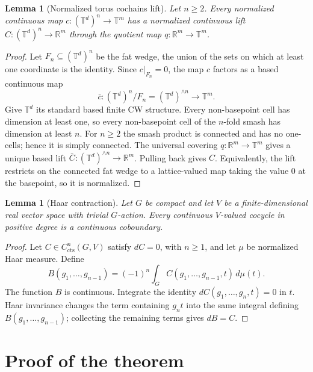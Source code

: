 \documentclass[11pt]{article}
\newtheorem{lemma}[theorem]{Lemma}
\newcommand{\T}{\mathbb T}
\newcommand{\R}{\mathbb R}
\newcommand{\cts}{\mathrm{cts}}
\begin{document}
\begin{lemma}[Normalized torus cochains lift]\label{lem:lift}
Let $n\ge2$.  Every normalized continuous map
$c:(\T^d)^n\to\T^m$ has a normalized continuous lift
$C:(\T^d)^n\to\R^m$ through the quotient map
$q:\R^m\to\T^m$.
\end{lemma}

\begin{proof}
Let $F_n\subseteq(\T^d)^n$ be the fat wedge, the union of the sets on which
at least one coordinate is the identity.  Since $c|_{F_n}=0$, the map $c$
factors as a based continuous map
\[
\bar c:(\T^d)^n/F_n=(\T^d)^{\wedge n}\longrightarrow\T^m.
\]
Give $\T^d$ its standard based finite CW structure.  Every non-basepoint cell
has dimension at least one, so every non-basepoint cell of the $n$-fold smash
has dimension at least $n$.  For $n\ge2$ the smash product is connected and
has no one-cells; hence it is simply connected.  The universal covering
$q:\R^m\to\T^m$ gives a unique based lift
$\bar C:(\T^d)^{\wedge n}\to\R^m$.  Pulling back gives $C$.  Equivalently,
the lift restricts on the connected fat wedge to a lattice-valued map taking
the value $0$ at the basepoint, so it is normalized.
\end{proof}

\begin{lemma}[Haar contraction]\label{lem:haar}
Let $G$ be compact and let $V$ be a finite-dimensional real vector space with
trivial $G$-action.  Every continuous $V$-valued cocycle in positive degree is
a continuous coboundary.
\end{lemma}

\begin{proof}
Let $C\in C^n_{\cts}(G,V)$ satisfy $dC=0$, with $n\ge1$, and let $\mu$ be
normalized Haar measure.  Define
\[
B(g_1,\ldots,g_{n-1})
=(-1)^n\int_G C(g_1,\ldots,g_{n-1},t)\,d\mu(t).
\]
The function $B$ is continuous.  Integrate the identity
$dC(g_1,\ldots,g_n,t)=0$ in $t$.  Haar invariance changes the term containing
$g_nt$ into the same integral defining $B(g_1,\ldots,g_{n-1})$; collecting
the remaining terms gives $dB=C$.
\end{proof}

\section{Proof of the theorem}
\end{document}
